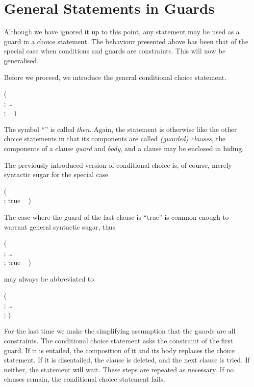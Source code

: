\section{General Statements in Guards}

Although we have ignored it up to this point, any statement may be
used as a guard in a choice statement.  The behaviour presented above
has been that of the special case when conditions and guards are
constraints.  This will now be generalised.

Before we proceed, we introduce the general conditional choice statement.
%
\begin{progex}
(  \cond\  \\
; \dots \\
;  \cond\  )
\end{progex}%
%
The symbol ``{\prog \cond}'' is called {\em then}.  Again, the
statement is otherwise like the other choice statements in that its
components are called {\em (guarded) clauses}, the components of a
clause {\em guard} and {\em body}, and a clause may be enclosed in
hiding.

The previously introduced version of conditional choice is, of course,
merely syntactic sugar for the special case
%
\begin{progex}
(  \cond\  \\
; true \cond\  )
\end{progex}%
%
The case where the guard of the last clause is ``{\prog true}'' is
common enough to warrant general syntactic sugar, thus
%
\begin{progex}
(  \cond\  \\
; \dots \\
; true \cond\  )
\end{progex}%
%
may always be abbreviated to
%
\begin{progex}
(  \cond\  \\
; \dots \\
;  )
\end{progex}%
%
For the last time we make the simplifying assumption that the guards
are all constraints.  The conditional choice statement asks the
constraint of the first guard.  If it is entailed, the composition of
it and its body replaces the choice statement.  If it is disentailed,
the clause is deleted, and the next clause is tried.  If neither, the
statement will wait.  These steps are repeated as necessary.  If no
clauses remain, the conditional choice statement fails.

